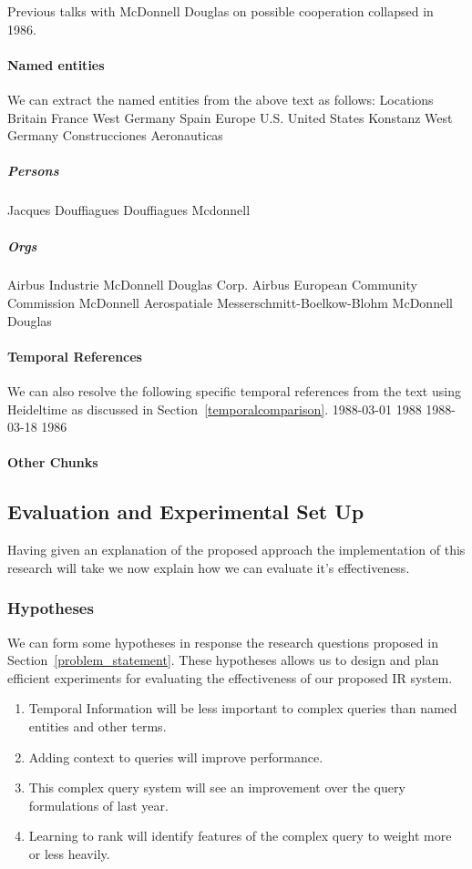 \documentclass{mprop}
\begin{document}
Previous talks with McDonnell Douglas on possible cooperation
collapsed in 1986.

\paragraph{Named entities}
We can extract the named entities from the above text as follows:
Locations
Britain
France
West Germany
Spain
Europe
U.S.
United States
Konstanz
West Germany
Construcciones Aeronauticas
\subparagraph{Persons}
Jacques Douffiagues
Douffiagues
Mcdonnell
\subparagraph{Orgs}
Airbus Industrie
McDonnell Douglas Corp.
Airbus
European Community Commission
McDonnell
Aerospatiale
Messerschmitt-Boelkow-Blohm
McDonnell Douglas

\paragraph{Temporal References}
We can also resolve the following specific temporal references from the text using Heideltime as discussed in Section~\ref{temporalcomparison}.
1988-03-01
1988
1988-03-18
1986

\paragraph{Other Chunks}

\subsection{Evaluation and Experimental Set Up}
Having given an explanation of the proposed approach the implementation of this research will take we now explain how we can evaluate it's effectiveness.

\subsubsection{Hypotheses}
We can form some hypotheses in response the research questions proposed in Section~\ref{problem_statement}. These hypotheses allows us to design and plan efficient experiments for evaluating the effectiveness of our proposed IR system.

\begin{enumerate}[label=\textbf{Hyp.\arabic*}]
\item Temporal Information will be less important to complex queries than named entities and other terms.
\item Adding context to queries will improve performance.
\item This complex query system will see an improvement over the query formulations of last year.
\item Learning to rank will identify features of the complex query to weight more or less heavily.
\end{enumerate}
\end{document}
